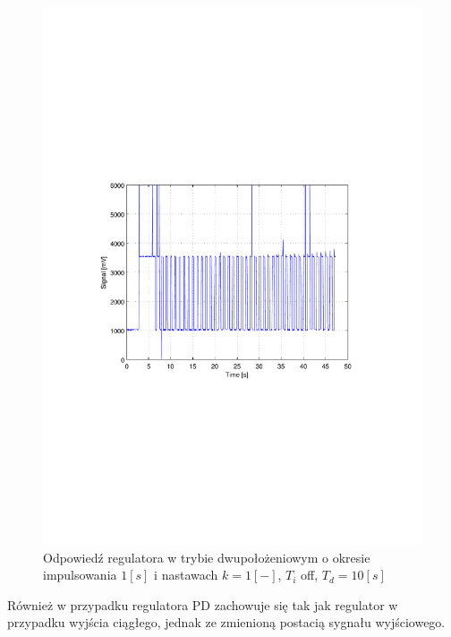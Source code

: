 \documentclass[12pt]{article}
\begin{document}
\begin{figure}[!htb]
	\begin{center}
		\includegraphics[width=12cm,trim=3cm 9cm 3cm 9cm,clip]
		{../res/img/dis_1_0_10.pdf}
	\end{center} 
	\caption{Odpowiedź regulatora w trybie dwupołożeniowym o okresie impulsowania
	$1[s]$ i nastawach $k=1[-]$, $T_i$ off, $T_d=10[s]$}
\end{figure}

Również w przypadku regulatora PD zachowuje się tak jak regulator w przypadku
wyjścia ciągłego, jednak ze zmienioną postacią sygnału wyjściowego.

\newpage
\end{document}
